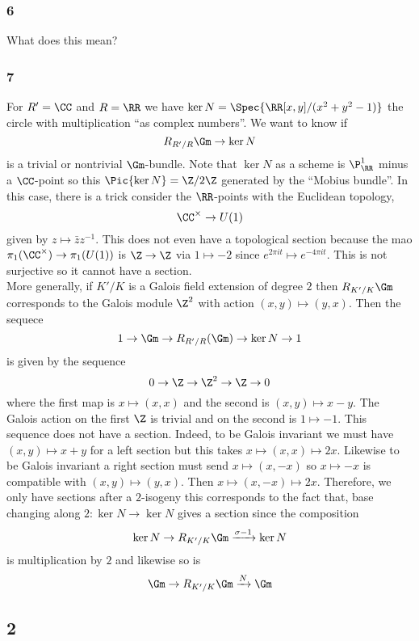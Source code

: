 \documentclass{article}
\begin{document}
\subsubsection{6}

What does this mean?

\subsubsection{7}

For $R' = \CC$ and $R = \RR$ we have $\ker{N} = \Spec{\RR[x,y]/(x^2 + y^2 - 1)}$ the circle with multiplication ``as complex numbers''. We want to know if 
\[ R_{R'/R} \Gm \to \ker{N} \]
is a trivial or nontrivial $\Gm$-bundle. Note that $\ker{N}$ as a scheme is $\P^1_{\RR}$ minus a $\CC$-point so this $\Pic{\ker{N}} = \Z / 2 \Z$ generated by the ``Mobius bundle''. In this case, there is a trick consider the $\RR$-points with the Euclidean topology, 
\[ \CC^\times \to U(1) \]
given by $z \mapsto \bar{z} z^{-1}$. This does not even have a topological section because the mao $\pi_1(\CC^\times) \to \pi_1(U(1))$ is $\Z \to \Z$ via $1 \mapsto -2$ since $e^{2 \pi i t} \mapsto e^{-4 \pi i t}$. This is not surjective so it cannot have a section.
\bigskip\\
More generally, if $K'/K$ is a Galois field extension of degree $2$ then $R_{K'/K} \Gm$ corresponds to the Galois module $\Z^2$ with action $(x,y) \mapsto (y,x)$. Then the sequece
\[ 1 \to \Gm \to R_{R'/R}(\Gm) \to \ker{N} \to 1 \]
is given by the sequence
\[ 0 \to \Z \to \Z^2 \to \Z \to 0 \]
where the first map is $x \mapsto (x,x)$ and the second is $(x,y) \mapsto x - y$. The Galois action on the first $\Z$ is trivial and on the second is $1 \mapsto -1$. This sequence does not have a section. Indeed, to be Galois invariant we must have $(x,y) \mapsto x + y$ for a left section but this takes $x \mapsto (x,x) \mapsto 2 x$. Likewise to be Galois invariant a right section must send $x \mapsto (x,-x)$ so $x \mapsto -x$ is compatible with $(x,y) \mapsto (y,x)$. Then $x \mapsto (x,-x) \mapsto 2 x$. Therefore, we only have sections after a $2$-isogeny this corresponds to the fact that,
base changing along $2 : \ker{N} \to \ker{N}$ gives a section since the composition 
\[ \ker{N} \to R_{K'/K} \Gm \xrightarrow{\sigma - 1} \ker{N} \] 
is multiplication by $2$ and likewise so is
\[ \Gm \to R_{K'/K} \Gm \xrightarrow{N} \Gm \]

\subsection{2}
\end{document}
